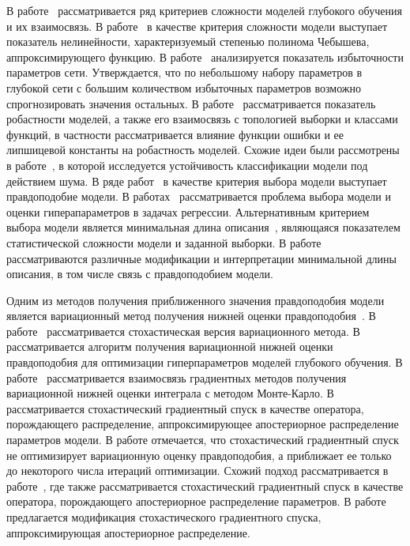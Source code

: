 В работе~\cite{perekrestenko} рассматривается ряд критериев сложности моделей глубокого обучения и их взаимосвязь. В работе~\cite{vladis} в качестве критерия сложности модели выступает показатель нелинейности, характеризуемый степенью полинома Чебышева, аппроксимирующего функцию. В работе~\cite{need_prune} анализируется показатель избыточности параметров сети. Утверждается, что по небольшому набору параметров в глубокой сети с большим количеством избыточных параметров возможно спрогнозировать значения остальных. В работе~\cite{rob} рассматривается показатель робастности моделей, а также его взаимосвязь с топологией выборки и классами функций, в частности рассматривается влияние функции ошибки и ее липшицевой константы на робастность моделей. Схожие идеи были рассмотрены в работе~\cite{intrig}, в которой исследуется устойчивость классификации модели под действием шума. 
В ряде работ~\cite{mackay,bishop,tokmakova,zaitsev,strijov_webber, strijov_dsc} в качестве критерия выбора модели  выступает правдоподобие модели. В работах~\cite{tokmakova,zaitsev,strijov_webber, strijov_dsc} рассматривается проблема выбора модели и оценки гиперапараметров в задачах регрессии. Альтернативным критерием выбора модели является минимальная длина описания~\cite{mdl}, являющаяся показателем статистической сложности модели и заданной выборки. В работе~\cite{mdl} рассматриваются различные модификации и интерпретации минимальной длины описания, в том числе связь с правдоподобием модели.

Одним из методов получения приближенного значения правдоподобия модели является вариационный метод получения нижней оценки правдоподобия~\cite{bishop}.  В работе~\cite{hoffman} рассматривается стохастическая версия вариационного метода.
В~\cite{nips} рассматривается алгоритм получения вариационной нижней оценки правдоподобия  для оптимизации гиперпараметров моделей глубокого обучения. 
В работе~\cite{varmc} рассматривается взаимосвязь градиентных методов получения вариационной нижней оценки интеграла с методом Монте-Карло.
В~\cite{early} рассматривается стохастический градиентный спуск в качестве оператора, порождающего распределение, аппроксимирующее апостериорное распределение параметров модели. В работе отмечается, что стохастический градиентный спуск не оптимизирует вариационную оценку правдоподобия, а приближает ее только до некоторого числа итераций оптимизации. 
Схожий подход рассматривается в работе~\cite{sgd_cont}, где также рассматривается стохастический градиентный спуск в качестве оператора, порождающего апостериорное распределение параметров. В работе~\cite{langevin} предлагается модификация стохастического градиентного спуска, аппроксимирующая апостериорное распределение. 


